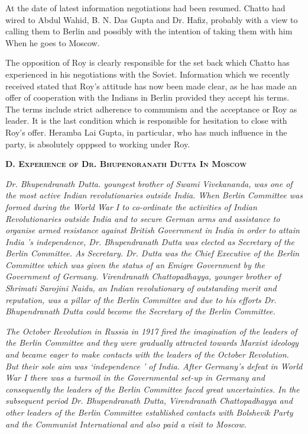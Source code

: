 At the date of latest information negotiations had been resumed. Chatto had wired to Abdul Wahid, B. N. Das Gupta and Dr. Hafiz, probably with a view to calling them to Berlin and possibly with the intention of taking them with him When he goes to Moscow. 

The opposition of Roy is clearly responsible for the set back which Chatto has experienced in his negotiations with the Soviet. Information which we recently received stated that Roy’s attitude has now been made clear, as he has made an offer of cooperation with the Indians in Berlin provided they accept his terms. The terms include strict adherence to communism and the acceptance or Roy as leader. It is the 
last condition which is responsible for hesitation to close with Roy’s offer. Heramba Lai Gupta, in particular, who has 
much influence in the party, is absolutely opppsed to working under Roy. 


\begin{center}
    \textbf{\textsc{D. Experience of Dr. Bhupenoranath Dutta In Moscow} }
\end{center}

\textit{Dr. Bhupendranath Dutta. youngest brother of Swami Vivekananda, was one of the most active Indian revolutionaries outside India. When Berlin Committee was formed during the World War I to co-ordinate the activities of Indian Revolutionaries outside India and to secure German arms and assistance to organise armed resistance against British Government in India in order to attain India 's independence, Dr. Bhupendranath Dutta was elected as Secretary of the Berlin Committee. As Secretary. Dr. Dutta was the Chief Executive of the Berlin Committee 
which was given the status of an Emigre Government by the Government of Germany. Virendranath Chattopadhayya, younger brother of Shrimati Sarojini Naidu, an Indian revolutionary of outstanding merit and reputation, was a pillar of the Berlin Committee and due to his efforts Dr. 
Bhupendranath Dutta could become the Secretary of the Berlin Committee. }

\textit{The October Revolution in Russia in 1917 fired the imagination of the leaders of the Berlin Committee and they were gradually attracted towards Marxist ideology and became eager to make contacts with the leaders of the October Revolution. But their sole aim was ‘independence ’ of India. After Germany’s defeat in World War I there was a turmoil in the Governmental set-up in Germany and consequently the leaders of the Berlin Committee faced great uncertainties. In the subsequent period Dr. Bhupendranath Dutta, Virendranath Chattopadhayya and other leaders of the Berlin Committee established contacts with Bolshevik Party and the Communist International and also paid a visit to Moscow. }

